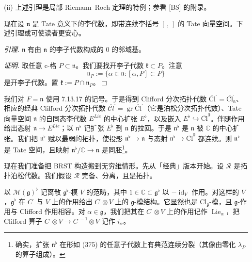 
(ii) 上述引理是局部 Riemann--Roch 定理的特例；参看 [BS] 的附录。

 现在设 $\mathfrak{n}$ 是 Tate 意义下的李代数，即带连续李括号 $[\,,\,]$ 的 Tate 向量空间。下述引理或可使读者更安心。

\emph{引理.} $\mathfrak{n}$ 有由 $\mathfrak{n}$ 的李子代数构成的 $0$ 的邻域基。

\emph{证明.} 取任意 c-格 $P\subset\mathfrak{n}$。我们要找开李子代数 $\mathfrak{k}\subset P$。注意
\begin{equation}\tag{375}
\mathfrak{n}_{P}:=\{\alpha\in\mathfrak{n}:[\alpha,P]\subset P\}
\end{equation}
是开李子代数。置 $\mathfrak{k}:=P\cap\mathfrak{n}_{P}$。\hfill$\Box$

 我们对 $F=\mathfrak{n}$ 使用 7.13.17 的记号。于是得到 Clifford 分次拓扑代数 $\overline{\mathrm{Cl}}^{\cdot}=\overline{\mathrm{Cl}}^{\cdot}_{\mathfrak{n}}$、相应的经典 Clifford 分次拓扑代数 $\overline{\mathcal{C}l}^{\cdot}=\operatorname{gr}\overline{\mathrm{Cl}}^{\cdot}$（它是泊松分次拓扑代数）、Tate 向量空间 $\mathfrak{n}$ 的自同态李代数 $E^{Lie}$ 的中心扩张 $E^{\flat}$，以及嵌入 $E^{\flat}\hookrightarrow\overline{\mathrm{Cl}}^{0}$。伴随作用给出态射 $\mathfrak{n}\to E^{Lie}$；以 $\mathfrak{n}^{\flat}$ 记扩张 $E^{\flat}$ 到 $\mathfrak{n}$ 的拉回。于是 $\mathfrak{n}^{\flat}$ 是 $\mathfrak{n}$ 被 $\mathbb{C}$ 的中心扩张。我们把 $\mathfrak{n}^{\flat}$ 赋以最弱的拓扑，使投影 $\mathfrak{n}^{\flat}\to\mathfrak{n}$ 与态射 $\mathfrak{n}^{\flat}\to\overline{\mathrm{Cl}}^{0}$ 都连续。则 $\mathfrak{n}^{\flat}$ 是 Tate 空间，且映射 $\mathfrak{n}^{\flat}/\mathbb{C}\to\mathfrak{n}$ 是同胚\footnote{确实，扩张 $\mathfrak{n}^{\flat}$ 在形如 (375) 的任意子代数上有典范连续分裂（其像由零化 $\lambda_{P}$ 的算子组成）。}。

 现在我们准备把 BRST 构造搬到无穷维情形。先从「经典」版本开始。设 $\mathcal{R}$ 是拓扑泊松代数。我们假设 $\mathcal{R}$ 完备、分离，且是拓扑。


 以 $\mathcal{M}(\mathfrak{g})^{\flat}$ 记离散 $\mathfrak{g}^{\flat}$-模 $V$ 的范畴，其中 $1\in\mathbb{C}\subset\mathfrak{g}^{\flat}$ 以 $-\operatorname{id}_{V}$ 作用。对这样的 $V$，$\mathfrak{g}^{\flat}$ 在 $C^{\cdot}$ 与 $V$ 上的作用给出 $C^{\cdot}\otimes V$ 上的 $\mathfrak{g}$-模结构。它显然也是 $\mathrm{Cl}_{\mathfrak{g}}$-模，且 $\mathfrak{g}$-作用与 Clifford 作用相容。对 $\alpha\in\mathfrak{g}$，我们把其在 $C^{\cdot}\otimes V$ 上的作用记作 $\operatorname{Lie}_{\alpha}$，把 Clifford 算子 $C^{\cdot}\otimes V\to C^{\cdot-1}\otimes V$ 记作 $i_{\alpha}$。

